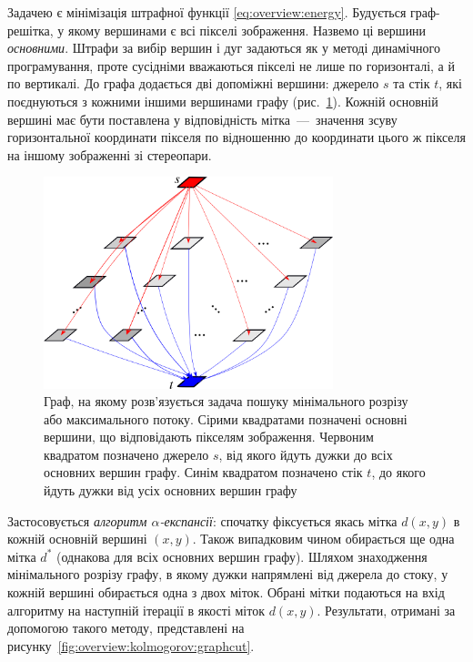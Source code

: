 Задачею є мінімізація штрафної функції \eqref{eq:overview:energy}.
Будується граф-решітка, у якому вершинами є всі пікселі зображення.
Назвемо ці вершини \textit{основними}.
Штрафи за вибір вершин і дуг задаються як у методі динамічного програмування,
проте сусідніми вважаються пікселі не лише по горизонталі,
а й по вертикалі.
До графа додається дві допоміжні вершини: джерело $s$ та стік $t$,
які поєднуються з кожними іншими вершинами графу (рис.~\ref{fig:maxflow:graph}).
Кожній основній вершині має бути поставлена у відповідність
мітка~---~значення зсуву горизонтальної координати пікселя по
відношенню до координати цього ж пікселя
на іншому зображенні зі стереопари.

\begin{figure}[h]
  \centering
  \includegraphics[width=0.75\textwidth]{images/maxflow_graph}
  \caption{Граф, на якому розв'язується задача пошуку мінімального розрізу
           або максимального потоку.
           Сірими квадратами позначені основні вершини,
           що відповідають пікселям зображення.
           Червоним квадратом позначено джерело $s$,
           від якого йдуть дужки до всіх основних вершин графу.
           Синім квадратом позначено стік $t$,
           до якого йдуть дужки від усіх основних вершин графу}
  \label{fig:maxflow:graph}
\end{figure}

Застосовується \textit{алгоритм $\alpha$-експансії}:
спочатку фіксується якась мітка $d \left(x, y \right)$ в кожній основній вершині
$\left(x, y \right)$.
Також випадковим чином обирається ще одна мітка $d^*$
(однакова для всіх основних вершин графу).
Шляхом знаходження мінімального розрізу графу,
в якому дужки напрямлені від джерела до стоку,
у кожній вершині обирається одна з двох міток.
Обрані мітки подаються на вхід алгоритму на наступній ітерації в якості міток
$d \left(x, y \right)$.
Результати, отримані за допомогою такого методу,
представлені на рисунку~\ref{fig:overview:kolmogorov:graphcut}.

